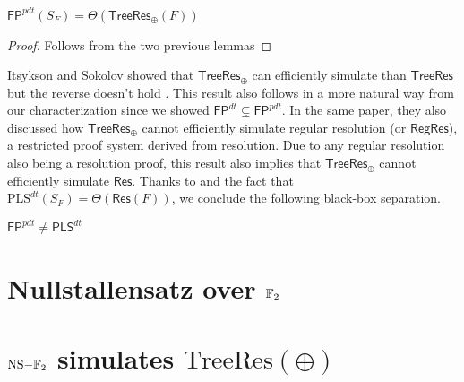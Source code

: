 \begin{theorem}
    $\mathsf{FP}^{pdt}(S_F) = \Theta(\mathsf{TreeRes}_\oplus(F))$
\end{theorem}

\begin{proof}
    Follows from the two previous lemmas
\end{proof}

Itsykson and Sokolov showed that $\mathsf{TreeRes}_\oplus$ can efficiently simulate than $\mathsf{TreeRes}$ but the reverse doesn't hold \cite{res_lin_2}. This result also follows in a more natural way from our characterization since we showed $\mathsf{FP}^{dt} \subsetneq \mathsf{FP}^{pdt}$. In the same paper, they also discussed how $\mathsf{TreeRes}_\oplus$ cannot efficiently simulate regular resolution (or $\mathsf{RegRes}$), a restricted proof system derived from resolution. Due to any regular resolution also being a resolution proof, this result also implies that $\mathsf{TreeRes}_\oplus$ cannot efficiently simulate $\mathsf{Res}$. Thanks to  and the fact that $\mathrm{PLS}^{dt}(S_F) = \Theta(\mathsf{Res}(F))$, we conclude the following black-box separation.

\begin{corollary}
    $\mathsf{FP}^{pdt} \neq \mathsf{PLS}^{dt}$
\end{corollary}

\section{Nullstallensatz over $\mathbb{F}_2$}

\section{$\mathrm{NS-}\mathbb{F}_2$ simulates $\mathrm{TreeRes}(\oplus)$}

\cleardoublepage